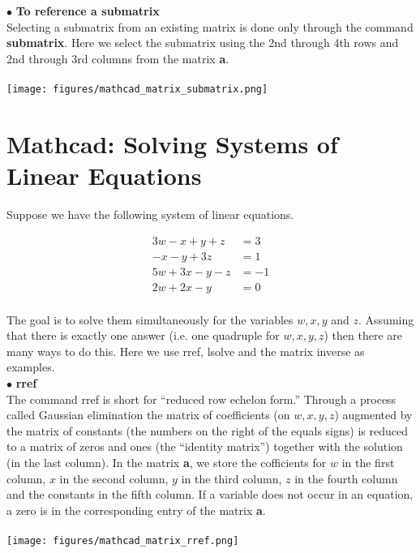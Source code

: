 $\bullet$ \textbf{To reference a submatrix}\\

Selecting a submatrix from an existing matrix is done only through the command \textbf{submatrix}.  Here we select the submatrix using the 2nd through 4th rows and 2nd through 3rd columns from the matrix \textbf{a}.  \\
\\
\texttt{[image: figures/mathcad\_matrix\_submatrix.png]}\\

\section{Mathcad: Solving Systems of Linear Equations}\label{sec:Mathcad_matrices4}


Suppose we have the following system of linear equations.

\[
\begin{array}{rl}
3w-x+y+z & = 3\\
-x-y+3z & = 1\\
5w+3x-y-z & = -1\\
2w+2x-y & = 0\\
\end{array}
\]

The goal is to solve them simultaneously for the variables $w,x,y$ and $z$.  Assuming that there is exactly one answer (i.e. one quadruple for $w,x,y,z$) then there are many ways to do this.  Here we use rref, lsolve and the matrix inverse as examples.\\

$\bullet$ \textbf{rref}\\

The command rref is short for ``reduced row echelon form.'' Through a process called Gaussian elimination the matrix of coefficients (on $w,x,y,z$) augmented by the matrix of constants (the numbers on the right of the equals signs) is reduced to a matrix of zeros and ones (the ``identity matrix'') together with the solution (in the last column).  In the matrix \textbf{a}, we store the cofficients for $w$ in the first column, $x$ in the second column, $y$ in the third column, $z$ in the fourth column and the constants in the fifth column.  If a variable does not occur in an equation, a zero is in the corresponding entry of the matrix \textbf{a}. \\
\\
\texttt{[image: figures/mathcad\_matrix\_rref.png]}\\


